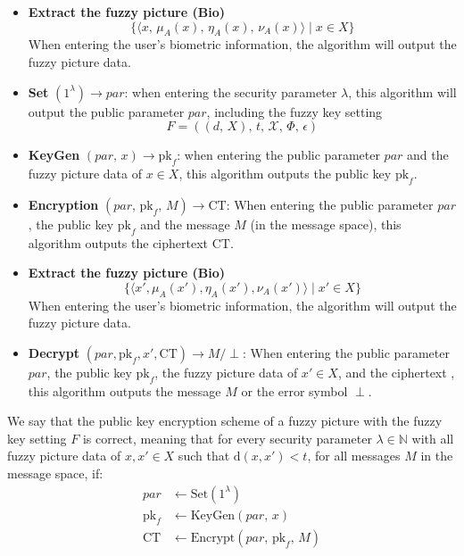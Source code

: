 \documentclass[graybox]{svmult}
\begin{document}
\begin{itemize}
    \item \textbf{Extract the fuzzy picture (Bio)}
          \begin{equation}
              \{ \langle x,\, \mu_A(x),\, \eta_A(x),\, \nu_A(x) \rangle \mid x \in X \}
          \end{equation}
          When entering the user's biometric information, the algorithm will output the fuzzy picture data.

    \item \textbf{Set} \( (1^\lambda) \to par  \): when entering the security parameter \( \lambda \), this algorithm will output the public parameter \(  par \), including the fuzzy key setting
          \begin{equation}
              F = ((d, \, X), \, t, \, \mathcal{X}, \, \varPhi, \, \epsilon)
          \end{equation}

    \item \textbf{KeyGen} \( (par ,\, x) \to \text{pk}_f \): when entering the public parameter \(  par \) and the fuzzy picture data of \( x \in X \), this algorithm outputs the public key \( \text{pk}_f \).

    \item \textbf{Encryption} \( (par ,\, \text{pk}_f,\, M) \to \text{CT} \): When entering the public parameter \(  par \), the public key \( \text{pk}_f \) and the message \( M \) (in the message space), this algorithm outputs the ciphertext \( \text{CT} \).

    \item \textbf{Extract the fuzzy picture (Bio)}
          \begin{equation}
              \{ \langle x', \mu_A(x'), \eta_A(x'), \nu_A(x') \rangle \mid x' \in X \}
          \end{equation}
          When entering the user's biometric information, the algorithm will output the fuzzy picture data.

    \item \textbf{Decrypt} \( (par , \text{pk}_f, x', \text{CT}) \to M/\perp \): When entering the public parameter \(  par \), the public key \( \text{pk}_f \), the fuzzy picture data of \( x' \in X \), and the ciphertext , this algorithm outputs the message \( M \) or the error symbol \( \perp \).

\end{itemize}

We say that the public key encryption scheme of a fuzzy picture with the fuzzy key setting \( F \) is correct, meaning that for every security parameter \( \lambda \in \mathbb{N} \) with all fuzzy picture data of \( x, x' \in X \) such that \( \mathrm{d}(x, x') < t \), for all messages \( M \) in the message space, if:
\begin{align}
    par         & \leftarrow \text{Set}(1^\lambda)                    \\[6pt]
    \text{pk}_f & \leftarrow \text{KeyGen}(par ,\, x)                 \\[6pt]
    \text{CT}   & \leftarrow \text{Encrypt}(par ,\, \text{pk}_f,\, M)
\end{align}
\end{document}
